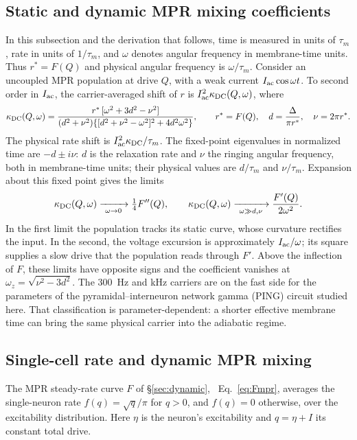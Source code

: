 \documentclass[11pt,a4paper]{article}
\newif\ifsupp
\begin{document}
\subsection{Static and dynamic MPR mixing coefficients}\label{app:mpr-coefficients}
In this subsection and the derivation that follows, time is measured in units
of $\tau_m$, rate in units of $1/\tau_m$, and $\omega$ denotes angular frequency
in membrane-time units. Thus $r^*=F(Q)$ and physical angular frequency is
$\omega/\tau_m$. Consider an uncoupled MPR population at drive $Q$, with a weak
current $I_{\rm ac}\cos\omega t$.
To second order in $I_{\rm ac}$, the carrier-averaged shift of $r$ is $I_{\rm ac}^2\kappa_{\rm DC}(Q,\omega)$, where
\begin{equation}
\kappa_{\rm DC}(Q,\omega)=\frac{r^*\,[\omega^2+3d^2-\nu^2]}{(d^2+\nu^2)\{[d^2+\nu^2-\omega^2]^2+4d^2\omega^2\}},
\qquad r^*=F(Q),\quad d=\frac{\Delta}{\pi r^*},\quad \nu=2\pi r^*.
\label{eq:crossover}
\end{equation}
The physical rate shift is $I_{\rm ac}^2\kappa_{\rm DC}/\tau_m$.
The fixed-point eigenvalues in normalized time are $-d\pm i\nu$: $d$ is the relaxation rate and $\nu$
the ringing angular frequency, both in membrane-time units; their physical
values are $d/\tau_m$ and $\nu/\tau_m$. Expansion about this fixed point gives the limits
\begin{equation}
\kappa_{\rm DC}(Q,\omega)\xrightarrow[\ \omega\to0\ ]{}\tfrac14F''(Q),\qquad
\kappa_{\rm DC}(Q,\omega)\xrightarrow[\ \omega\gg d,\nu\ ]{}\frac{F'(Q)}{2\omega^2}.
\label{eq:crossover_limits}
\end{equation}
In the first limit the population tracks its static curve, whose curvature rectifies
the input. In the second, the voltage excursion is approximately $I_{\rm ac}/\omega$; its
square supplies a slow drive that the population reads through $F'$. Above the
inflection of $F$, these limits have opposite signs and the coefficient vanishes at
$\omega_z=\sqrt{\nu^2-3d^2}$. The $300$~Hz and kHz carriers
are on the fast side for the parameters of the pyramidal--interneuron network gamma
(PING) circuit studied here. That classification is
parameter-dependent: a shorter effective membrane time can bring the same physical
carrier into the adiabatic regime.


\subsection{Single-cell rate and dynamic MPR mixing}\label{app:mpr-mixing}
The MPR steady-rate curve $F$ of \S\ref{sec:dynamic}, \ifsupp main-text\fi\ Eq.~\eqref{eq:Fmpr}, averages the single-neuron rate $f(q)=\sqrt q/\pi$ for
$q>0$, and $f(q)=0$ otherwise, over the excitability distribution. Here $\eta$ is
the neuron's excitability and $q=\eta+I$ its constant total drive.
\end{document}
